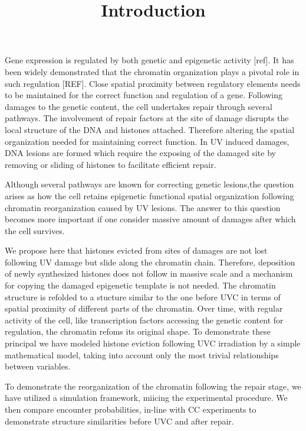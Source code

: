 \documentclass[12pt]{article}
\begin{document}
	
	\title{Introduction}
	\maketitle
	 Gene expression is regulated by both genetic and epigenetic activity [ref]. It has been widely demonstrated that the chromatin organization plays a pivotal role in such regulation [REF]. Close spatial proximity between regulatory elements needs to be maintained for the correct function and regulation of a gene.  
	 Following damages to the genetic content, the cell undertakes repair through several pathways. The involvement of repair factors at the site of damage disrupts the local structure of the DNA and histones attached. Therefore altering the spatial organization needed for maintaining correct function. In UV induced damages, DNA lesions are formed which require the exposing of the damaged site by removing or sliding of histones to facilitate efficient repair. 
	 
	Although several pathways are known for correcting genetic lesions,the question arises as how the cell retains epigenetic functional spatial organization following chromatin reorganization caused by UV lesions. The answer to this question becomes more important if one consider massive amount of damages after which the cell survives. 
	
	We propose here that histones evicted from sites of damages are not lost following UV damage but slide along the chromatin chain. Therefore, deposition of newly synthesized histones does not follow in massive scale and a mechanism for copying the damaged epigenetic template is not needed. The chromatin structure is refolded to a stucture similar to the one before UVC in terms of spatial proximity of different parts of the chromatin. Over time, with regular activity of the cell, like transcription factors accessing the genetic content for regulation, the chromatin refoms its original shape.  
	To demonstrate these principal we have modeled histone eviction following UVC irradiation by a simple mathematical model, taking into account only the most trivial relationships between variables.
		
	 To demonstrate the reorganization of the chromatin following the repair stage, we have utilized a simulation framework, miicing the experimental procedure. We then compare encounter probabilities, in-line with CC experiments to demonstrate structure similarities before UVC and after repair. 			
	
\end{document}
